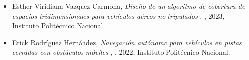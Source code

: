 \begin{itemize} 
\item Esther-Viridiana Vazquez Carmona, \textit{ Diseño de un algoritmo de cobertura de espacios tridimensionales para vehículos aéreos no tripulados }, \href{ https://jivg.org/wp-content/uploads/2023/02/2023_phd_Vazquez.pdf }{\faFilePdfO}, 2023, Instituto Politécnico Nacional. 
\item Erick Rodríguez Hernández, \textit{ Navegación autónoma para vehículos en pistas cerradas con obstáculos móviles }, \href{ https://jivg.org/wp-content/uploads/2022/08/2022_phd_Rodriguez.pdf }{\faFilePdfO}, 2022, Instituto Politécnico Nacional. 
\end{itemize} 
